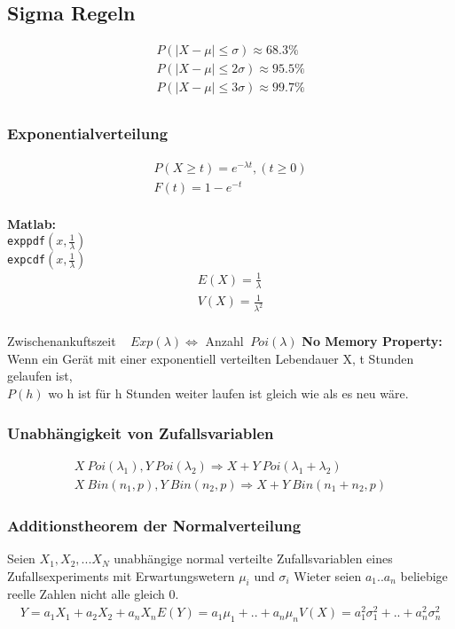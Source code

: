 \documentclass[landscape,twocolumn,a4paper]{article}
\begin{document}
\subsection*{Sigma Regeln}
\begin{align}
 P(|X-\mu| \le \sigma) \approx 68.3\%\\
 P(|X-\mu| \le 2\sigma) \approx 95.5\%\\
 P(|X-\mu| \le 3\sigma) \approx 99.7\%\\
\end{align}
\subsubsection*{Exponentialverteilung}
\begin{align}
P (X \ge t) = e^{-\lambda t}, (t \ge 0) \\
F(t) = 1-e^{-t}\\
\end{align}

\textbf{Matlab:}\\
\texttt{exppdf}$(x,\frac{1}{\lambda})$\\
\texttt{expcdf}$(x,\frac{1}{\lambda})$\\

\begin{align}
 E(X) = \frac{1}{\lambda} \\
 V(X) = \frac{1}{\lambda^2}\\
\end{align}

Zwischenankuftszeit ~ $ Exp(\lambda) \Leftrightarrow$ Anzahl $~ Poi(\lambda)$
\textbf{No Memory Property:} Wenn ein Gerät mit einer exponentiell verteilten Lebendauer X, t Stunden gelaufen ist,\\
$P(h)$ wo h ist für h Stunden weiter laufen ist gleich wie als es neu wäre.

\subsubsection*{Unabhängigkeit von Zufallsvariablen}

\begin{align}
 X ~ Poi(\lambda_1) , Y ~ Poi(\lambda_2)  \Rightarrow X + Y ~ Poi (\lambda_1+\lambda_2)\\
 X ~ Bin (n_1,p) , Y ~ Bin(n_2,p) \Rightarrow X + Y ~ Bin(n_1+n_2,p)
\end{align}

\subsubsection*{Additionstheorem der Normalverteilung}
Seien $X_1,X_2,...X_N $ unabhängige normal verteilte Zufallsvariablen eines Zufallsexperiments mit Erwartungswetern 
$\mu_i$ und $\sigma_i$ Wieter seien $a_1..a_n$ beliebige reelle Zahlen nicht alle gleich 0. 
\begin{align}
  Y = a_1 X_1 + a_2 X_2 + a_n X_n
  E(Y) = a_1\mu_1 +..+ a_n\mu_n
  V(X) = a_1^2\sigma_1^2+..+a_n^2\sigma_n^2
\end{align}
\end{document}

